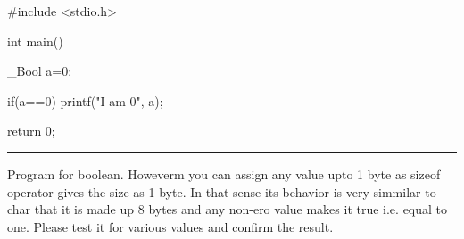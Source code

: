 #include <stdio.h>

int main()
{
  _Bool a=0;

   if(a==0)
   {
     printf("I am 0\n", a);
   }

   return 0;
}
\stopCPP
{}
\hrule
\blank[force,1mm]
\startalignment[middle]
Program for boolean.
\stopalignment
Howeverm you can assign any value upto 1 byte as sizeof operator gives
the size as 1 byte. In that sense its behavior is very simmilar to
char that it is made up 8 bytes and any non-ero value makes it true
i.e. equal to one. Please test it for various values and confirm the
result.

\subsubsection{}
